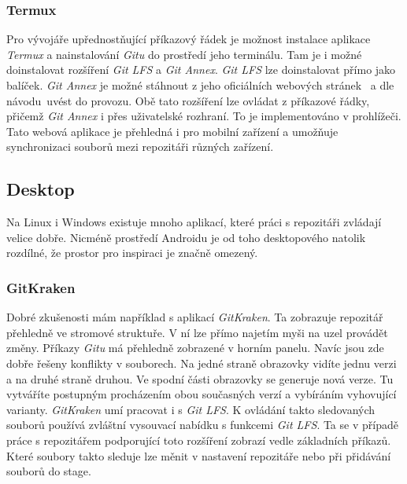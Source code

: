         \subsubsection{Termux~}
        Pro vývojáře upřednostňující příkazový řádek je možnost instalace aplikace \emph{Termux} a nainstalování \emph{Gitu} do prostředí jeho terminálu. Tam je i možné doinstalovat rozšíření \emph{Git LFS} a \emph{Git Annex}. \emph{Git LFS} lze doinstalovat přímo jako balíček. \emph{Git Annex} je možné stáhnout z jeho oficiálních webových stránek~ a dle návodu~uvést do provozu. Obě tato rozšíření lze ovládat z příkazové řádky, přičemž \emph{Git Annex} i přes uživatelské rozhraní. To je implementováno v prohlížeči. Tato webová aplikace je přehledná i pro mobilní zařízení a umožňuje synchronizaci souborů mezi repozitáři různých zařízení.

    \subsection {Desktop}
    Na Linux i Windows existuje mnoho aplikací, které práci s repozitáři zvládají velice dobře. Nicméně prostředí Androidu je od toho desktopového natolik rozdílné, že prostor pro inspiraci je značně omezený.
        \subsubsection{GitKraken~}
        Dobré zkušenosti mám například s aplikací \emph{GitKraken}. Ta zobrazuje repozitář přehledně ve stromové struktuře. V ní lze přímo najetím myši na uzel provádět změny. Příkazy \emph{Gitu} má přehledně zobrazené v horním panelu. Navíc jsou zde dobře řešeny konflikty v souborech. Na jedné straně obrazovky vidíte jednu verzi a na druhé straně druhou. Ve spodní části obrazovky se generuje nová verze. Tu vytváříte postupným procházením obou současných verzí a vybíráním vyhovující varianty. \emph{GitKraken} umí pracovat i s \emph{Git LFS}. K ovládání takto sledovaných souborů používá zvláštní vysouvací nabídku s funkcemi \emph{Git LFS}. Ta se v případě práce s repozitářem podporující toto rozšíření zobrazí vedle základních příkazů. Které soubory takto sleduje lze měnit v nastavení repozitáře nebo při přidávání souborů do stage.

